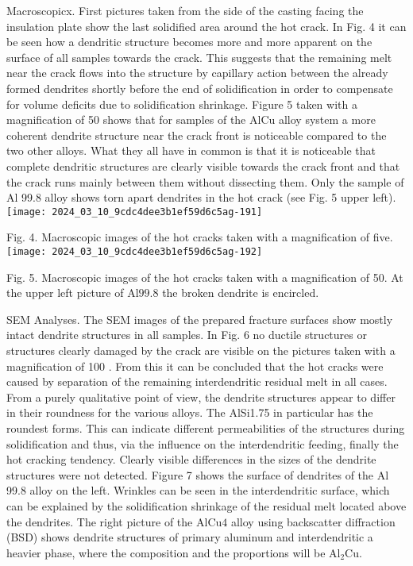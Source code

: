 \documentclass[10pt]{article}
\begin{document}
Macroscopicx. First pictures taken from the side of the casting facing the insulation plate show the last solidified area around the hot crack. In Fig. 4 it can be seen how a dendritic structure becomes more and more apparent on the surface of all samples towards the crack. This suggests that the remaining melt near the crack flows into the structure by capillary action between the already formed dendrites shortly before the end of solidification in order to compensate for volume deficits due to solidification shrinkage. Figure 5 taken with a magnification of 50 shows that for samples of the $\mathrm{AlCu}$ alloy system a more coherent dendrite structure near the crack front is noticeable compared to the two other alloys. What they all have in common is that it is noticeable that complete dendritic structures are clearly visible towards the crack front and that the crack runs mainly between them without dissecting them. Only the sample of Al 99.8 alloy shows torn apart dendrites in the hot crack (see Fig. 5 upper left).\\
\texttt{[image: 2024\_03\_10\_9cdc4dee3b1ef59d6c5ag-191]}

Fig. 4. Macroscopic images of the hot cracks taken with a magnification of five.\\
\texttt{[image: 2024\_03\_10\_9cdc4dee3b1ef59d6c5ag-192]}

Fig. 5. Macroscopic images of the hot cracks taken with a magnification of 50. At the upper left picture of $\mathrm{Al} 99.8$ the broken dendrite is encircled.

SEM Analyses. The SEM images of the prepared fracture surfaces show mostly intact dendrite structures in all samples. In Fig. 6 no ductile structures or structures clearly damaged by the crack are visible on the pictures taken with a magnification of 100 . From this it can be concluded that the hot cracks were caused by separation of the remaining interdendritic residual melt in all cases. From a purely qualitative point of view, the dendrite structures appear to differ in their roundness for the various alloys. The AlSi1.75 in particular has the roundest forms. This can indicate different permeabilities of the structures during solidification and thus, via the influence on the interdendritic feeding, finally the hot cracking tendency. Clearly visible differences in the sizes of the dendrite structures were not detected. Figure 7 shows the surface of dendrites of the Al 99.8 alloy on the left. Wrinkles can be seen in the interdendritic surface, which can be explained by the solidification shrinkage of the residual melt located above the dendrites. The right picture of the $\mathrm{AlCu} 4$ alloy using backscatter diffraction (BSD) shows dendrite structures of primary aluminum and interdendritic a heavier phase, where the composition and the proportions will be $\mathrm{Al}_{2} \mathrm{Cu}$.
\end{document}
